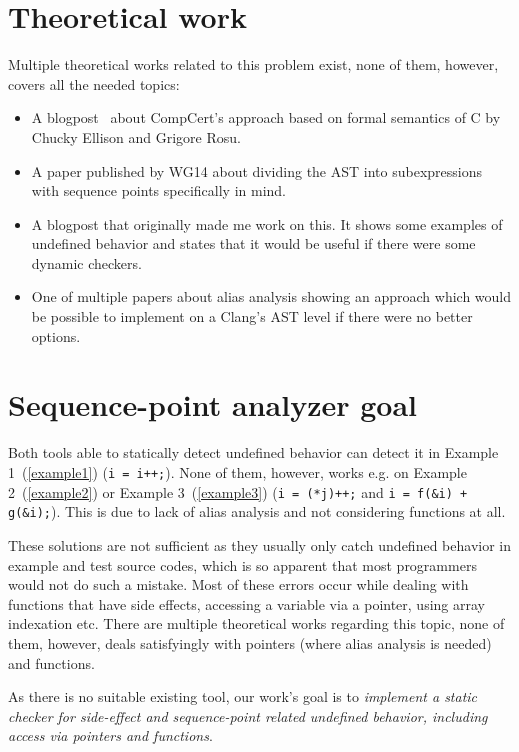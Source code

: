 \section{Theoretical work}
Multiple theoretical works related to this problem exist, none of them, however, covers all the needed topics:
\begin{itemize}
\item A blogpost~\cite{CompCertBlogpost} about CompCert's approach based on formal semantics of C by Chucky Ellison and Grigore Rosu.~\cite{formalSemantics}
\item A paper published by WG14 about dividing the AST into subexpressions with sequence points specifically in mind.~\cite{seqPointWG14}
\item A blogpost that originally made me work on this. It shows some examples of undefined behavior and states that it would be useful if there were some dynamic checkers.~\cite{regehr}
\item One of multiple papers about alias analysis showing an approach which would be possible to implement on a Clang's AST level if there were no better options.~\cite{steensgaard}
\end{itemize}
\section{Sequence-point analyzer goal}
Both tools able to statically detect undefined behavior can detect it in Example 1~(\ref{example1}) (\verb|i = i++;|). None of them, however, works e.g. on Example 2~(\ref{example2}) or Example 3~(\ref{example3}) (\verb|i = (*j)++;| and \verb|i = f(&i) + g(&i);|). This is due to lack of alias analysis and not considering functions at all.

These solutions are not sufficient as they usually only catch undefined behavior in example and test source codes, which is so apparent that most programmers would not do such a mistake. Most of these errors occur while dealing with functions that have side effects, accessing a variable via a pointer, using array indexation etc.
There are multiple theoretical works regarding this topic, none of them, however, deals satisfyingly with pointers (where alias analysis is needed)~\cite{aliasAnalysis} and functions.

As there is no suitable existing tool, our work's goal is to \emph{implement a static checker for side-effect and sequence-point related undefined behavior, including access via pointers and functions}.

